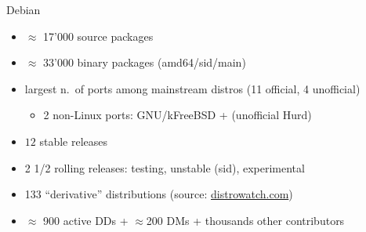 \documentclass[]{beamer}
\begin{document}
\begin{frame}[t]{Debian%
  }
  \begin{itemize}
  \item $\approx$ 17'000 source packages
  \item $\approx$ 33'000 binary packages (amd64/sid/main)
  \item largest n.~of \alert{ports} among mainstream distros (11
    official, 4 unofficial)
    \begin{itemize}
    \item 2 non-Linux ports: GNU/kFreeBSD + (unofficial Hurd)
    \end{itemize}\pause
  \item $12$ \alert{stable} releases
  \item<7-> 2 1/2 \alert{rolling} releases: testing, unstable (sid),
    experimental
  \item<11-> 133 ``\alert{derivative}'' distributions\pause
    \hfill {\small (source: \href{http://www.distrowatch.com}{distrowatch.com})}
  \item<15-> $\approx$ 900 active \alert{DDs} + $\approx$200 \alert{DMs} + thousands other
    \alert{contributors}
  \end{itemize}


\end{frame}
\end{document}
